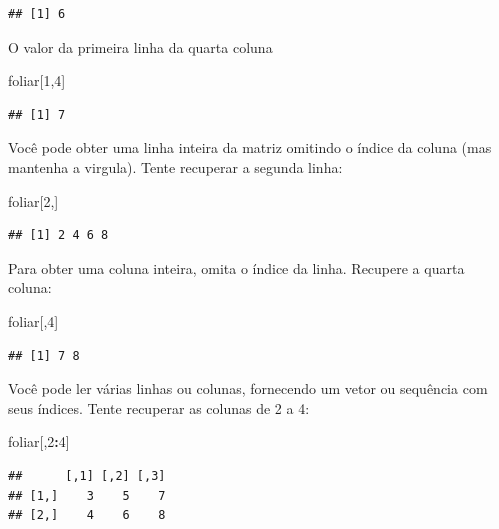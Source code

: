 \documentclass[
]{book}
\newenvironment{Shaded}{\begin{snugshade}}{\end{snugshade}}
\newcommand{\DecValTok}[1]{\textcolor[rgb]{0.00,0.00,0.81}{#1}}
\newcommand{\NormalTok}[1]{#1}
\newcommand{\OperatorTok}[1]{\textcolor[rgb]{0.81,0.36,0.00}{\textbf{#1}}}
\begin{document}
\begin{verbatim}
## [1] 6
\end{verbatim}

O valor da primeira linha da quarta coluna

\begin{Shaded}
\begin{Highlighting}[]
\NormalTok{foliar[}\DecValTok{1}\NormalTok{,}\DecValTok{4}\NormalTok{]}
\end{Highlighting}
\end{Shaded}

\begin{verbatim}
## [1] 7
\end{verbatim}

Você pode obter uma linha inteira da matriz omitindo o índice da coluna (mas mantenha a virgula). Tente recuperar a segunda linha:

\begin{Shaded}
\begin{Highlighting}[]
\NormalTok{foliar[}\DecValTok{2}\NormalTok{,]}
\end{Highlighting}
\end{Shaded}

\begin{verbatim}
## [1] 2 4 6 8
\end{verbatim}

Para obter uma coluna inteira, omita o índice da linha. Recupere a quarta coluna:

\begin{Shaded}
\begin{Highlighting}[]
\NormalTok{foliar[,}\DecValTok{4}\NormalTok{]}
\end{Highlighting}
\end{Shaded}

\begin{verbatim}
## [1] 7 8
\end{verbatim}

Você pode ler várias linhas ou colunas, fornecendo um vetor ou sequência com seus índices. Tente recuperar as colunas de 2 a 4:

\begin{Shaded}
\begin{Highlighting}[]
\NormalTok{foliar[,}\DecValTok{2}\OperatorTok{:}\DecValTok{4}\NormalTok{]}
\end{Highlighting}
\end{Shaded}

\begin{verbatim}
##      [,1] [,2] [,3]
## [1,]    3    5    7
## [2,]    4    6    8
\end{verbatim}
\end{document}
